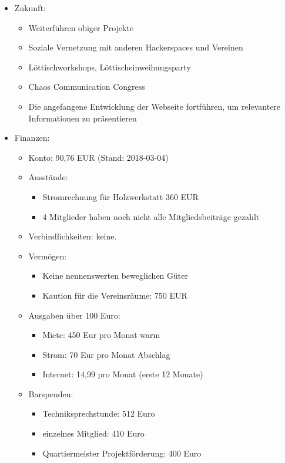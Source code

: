 \documentclass[10pt,a4paper]{scrartcl}
\begin{document}
\begin{itemize}
		\item Zukunft:
		\begin{itemize}
			\item Weiterf{\"u}hren obiger Projekte
			\item Soziale Vernetzung mit anderen Hackerspaces und Vereinen
			\item L{\"o}ttischworkshops, L{\"o}ttischeinweihungsparty
			\item Chaos Communication Congress
			\item Die angefangene Entwicklung der Webseite fortf{\"u}hren,
			           um relevantere Informationen zu pr{\"a}sentieren
		\end{itemize}

		\item Finanzen:
		\begin{itemize}
			\item Konto: 90,76 EUR (Stand: 2018-03-04)
			\item Ausst{\"a}nde:
			\begin{itemize}
				\item Stromrechnung f{\"u}r Holzwerkstatt 360 EUR
				\item 4 Mitglieder haben noch nicht alle Mitgliedsbeitr{\"a}ge gezahlt
			\end{itemize}
			\item Verbindlichkeiten: keine.
			\item Verm{\"o}gen:
			\begin{itemize}
				\item Keine nennenswerten beweglichen G{\"u}ter
				\item Kaution f{\"u}r die Vereinsr{\"a}ume: 750 EUR
			\end{itemize}
			\item Ausgaben {\"u}ber 100 Euro:
			\begin{itemize}
				\item Miete: 450 Eur pro Monat warm
				\item Strom: 70 Eur pro Monat Abschlag
				\item Internet: 14,99 pro Monat (erste 12 Monate)
			\end{itemize}
			\item Barspenden:
			\begin{itemize}
				\item Techniksprechstunde: 512 Euro
				\item einzelnes Mitglied: 410 Euro
				\item Quartiermeister Projektf{\"o}rderung: 400 Euro

\end{itemize}
\end{itemize}
\end{itemize}
\end{document}
